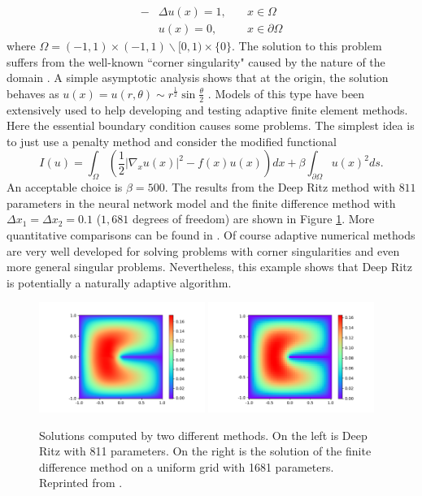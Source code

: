 \documentclass[12pt,AutoFakeBold,AutoFakeSlant]{article}
\theoremstyle{definition}
\begin{document}
	\begin{equation}
	\begin{aligned}
	-&\Delta u(x)=1,\quad &x\in \Omega\\
	&u(x)=0,\quad &x\in \partial \Omega
	\end{aligned}
	\end{equation}
	where $\Omega=(-1,1)\times (-1,1) \backslash [0,1)\times \{0\}$.
	The solution to this problem suffers from the well-known ``corner singularity"
	caused by the nature of the domain \cite{strang1973analysis}.
	A simple asymptotic analysis shows that at the origin,  the solution
	behaves as
	$u(x)=u(r,\theta) \sim r^{\frac{1}{2}}\sin\frac{\theta}{2}$
	\cite{strang1973analysis}.
	Models of this type have been extensively used
	to help developing and testing adaptive finite element methods.
	Here the essential boundary condition causes some problems.
	The simplest idea is to just  use a penalty method and consider
	the modified functional
	\begin{equation}
	I(u) = \int_\Omega \left( \frac{1}{2} |\nabla_x u(x)|^2 - f(x) u(x) \right) dx
	+\beta \int_{\partial \Omega} u(x)^2 ds.
	\end{equation}
	An acceptable choice is $\beta = 500$.
	The results from the Deep Ritz method 
	with $811$ parameters in the neural network model
	and the finite difference method with $\Delta x_1=\Delta x_2=0.1$ ($1,681$
	degrees of freedom) are shown in Figure \ref{fig:ritz}.
	More quantitative comparisons can be found in \cite{E2018deep}.
	Of course adaptive numerical methods are very well developed for solving
	problems with corner singularities and even more general singular problems.
	Nevertheless, this example shows that Deep Ritz is potentially a naturally
	adaptive algorithm.
	\begin{figure}
	\centering
	\includegraphics[width=0.48\textwidth,height=0.3\textwidth]{figs/pe_01.pdf}
	\includegraphics[width=0.48\textwidth,height=0.3\textwidth]{figs/pe_01_d.pdf}
	\caption{Solutions computed by two different methods. On the left is Deep Ritz with
	811 parameters. On the right is the solution of the finite difference method on a uniform
	grid with 1681 parameters.
	Reprinted from \cite{E2018deep}.
	}
	\label{fig:ritz}
	\end{figure}
\end{document}
